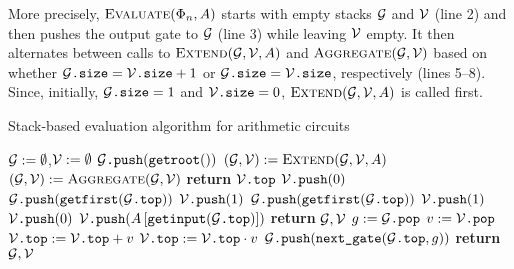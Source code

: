 More precisely, $\textsc{Evaluate}(\Phi_n,A)$ starts with empty stacks $\mathcal{G}$ and $\mathcal{V}$ (line 2) and then pushes the output
gate to $\mathcal{G}$ (line 3) while leaving $\mathcal{V}$ empty. It then alternates between calls to $\textsc{Extend}(\mathcal{G},\mathcal{V},A)$ and $\textsc{Aggregate}(\mathcal{G},\mathcal{V})$ based on whether $\mathcal{G}\texttt{.size} = \mathcal{V}\texttt{.size}+1$ or $\mathcal{G}\texttt{.size} = \mathcal{V}\texttt{.size}$, respectively (lines 5--8). Since, initially, $\mathcal{G}\texttt{.size}=1$ and $\mathcal{V}\texttt{.size}=0$, $\textsc{Extend}(\mathcal{G},\mathcal{V},A)$ is
called first.
 \begin{algorithm}[t]
  \caption{Stack-based evaluation algorithm for arithmetic circuits}
 \label{alg:eval_code}
 \begin{algorithmic}[1]
   \State $\mathcal{G}:=\emptyset$,$\mathcal{V}:=\emptyset$
    \State $\mathcal{G}\texttt{.push}(\texttt{getroot}())$ 
             \State $(\mathcal{G},\mathcal{V}) := \textsc{Extend}(\mathcal{G},\mathcal{V},A)$
         \Else
             \State $(\mathcal{G},\mathcal{V}):= \textsc{Aggregate}(\mathcal{G},\mathcal{V})$
         \EndIf
     \EndWhile
     \State \textbf{return} $\mathcal{V}\texttt{.top}$
 \EndFunction
     \If{$\isplus{\gettop{\cG}}$} 
         \State $\mathcal{V}\texttt{.push}(0)$
         \State $\mathcal{G}\texttt{.push}(\texttt{getfirst}(\mathcal{G}\texttt{.top}))$ 
     \ElsIf{$\isprod{\gettop{\cG}}$} 
         \State $\mathcal{V}\texttt{.push}(1)$
         \State $\mathcal{G}\texttt{.push}(\texttt{getfirst}(\mathcal{G}\texttt{.top}))$
     \ElsIf{$\isone{\gettop{\cG}}$} 
         \State $\mathcal{V}\texttt{.push}(1)$
     \ElsIf{$\iszero{\gettop{\cG}}$} 
     \State $\mathcal{V}\texttt{.push}(0)$
     \ElsIf{$\isinput{\gettop{\cG}}$} 
         \State $\mathcal{V}\texttt{.push}(A\left[ \texttt{getinput}(\mathcal{G}\texttt{.top}) \right])$ 
     \EndIf
     \State \textbf{return} $\mathcal{G}, \mathcal{V}$
 \EndFunction
     \State $g := \mathcal{G}\texttt{.pop}$
     \State $v := \mathcal{V}\texttt{.pop}$
     \If{$\isplus{\gettop{\cG}}$}
         \State $\mathcal{V}\texttt{.top} := \mathcal{V}\texttt{.top} + v$
     \ElsIf{$\isprod{\gettop{\cG}}$}
         \State $\mathcal{V}\texttt{.top} := \mathcal{V}\texttt{.top} \cdot v$
     \EndIf
      
         \State $\mathcal{G}\texttt{.push}(\texttt{next{\_}gate}(\mathcal{G}\texttt{.top}, g))$ 
     \EndIf
     \State \textbf{return} $\mathcal{G}, \mathcal{V}$
 \EndFunction
  \end{algorithmic}
 \end{algorithm}
